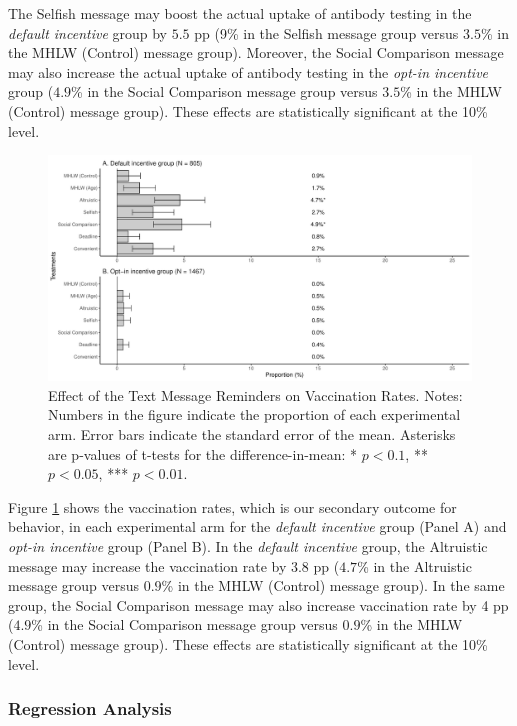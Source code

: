 \documentclass[
  11pt,
  a4paper
]{article}
\begin{document}
The Selfish message may boost the actual uptake of antibody testing in the \emph{default incentive} group by \(5.5\) pp (9\% in the Selfish message group versus \(3.5\)\% in the MHLW (Control) message group). Moreover, the Social Comparison message may also increase the actual uptake of antibody testing in the \emph{opt-in incentive} group (\(4.9\)\% in the Social Comparison message group versus \(3.5\)\% in the MHLW (Control) message group). These effects are statistically significant at the 10\% level.

\begin{figure}[t]
\includegraphics{Main-Document-LaTeX_files/figure-latex/ttest-act-vacc-1} \caption{Effect of the Text Message Reminders on Vaccination Rates. Notes: Numbers in the figure indicate the proportion of each experimental arm. Error bars indicate the standard error of the mean. Asterisks are p-values of t-tests for the difference-in-mean: * $p < 0.1$, ** $p < 0.05$, *** $p < 0.01$.}\label{fig:ttest-act-vacc}
\end{figure}

Figure \ref{fig:ttest-act-vacc} shows the vaccination rates, which is our secondary outcome for behavior, in each experimental arm for the \emph{default incentive} group (Panel A) and \emph{opt-in incentive} group (Panel B). In the \emph{default incentive} group, the Altruistic message may increase the vaccination rate by \(3.8\) pp (\(4.7\)\% in the Altruistic message group versus \(0.9\)\% in the MHLW (Control) message group). In the same group, the Social Comparison message may also increase vaccination rate by 4 pp (\(4.9\)\% in the Social Comparison message group versus \(0.9\)\% in the MHLW (Control) message group). These effects are statistically significant at the 10\% level.

\hypertarget{regression-analysis-1}{%
\subsubsection{Regression Analysis}\label{regression-analysis-1}}
\end{document}
